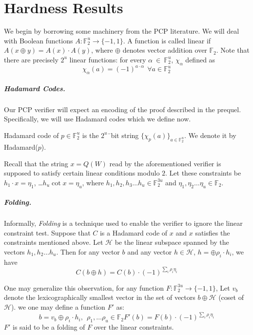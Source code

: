 \chapter{Hardness Results}\label{section:hardness}

We begin by borrowing some machinery from the PCP literature. 
We will deal with Boolean functions $A:\mathbb{F}^u_2 \rightarrow
\{-1, 1\}$.  A function is called linear if $A(x \oplus y) = A(x)
\cdot A(y)$, where $\oplus$ denotes vector addition over
$\mathbb{F}_2$. Note that there are precisely $2^u$ linear functions:
for every $\alpha\ \in \ \mathbb{F}^u_2$, $\chi_\alpha$
defined as
\[
\chi_\alpha(a) = (-1)^{a \cdot \alpha} ~~\forall a \in \mathbb{F}^u_2
\]


\paragraph{Hadamard Codes.} Our PCP verifier will
expect an encoding of the proof described in the prequel.
Specifically, we will use Hadamard codes which we define now.


\begin{definition}
Hadamard code of $p \in \mathbb{F}^{u}_2$ is the $2^u$¯bit string 
$\{\chi_p(a)\}_{a \in \mathbb{F}^u_2}$. We denote it by Hadamard($p$).
\end{definition}

Recall that the string $x = Q(W)$ read by the aforementioned verifier
is supposed to satisfy certain linear conditions modulo $2$. Let these
constraints be $h_1 \cdot x = \eta_1$, \ldots $h_u \cot x = \eta_u$,
where $h_1, h_2, h_3 \ldots h_u \in \mathbb{F}^{3u}_2$ and $\eta_1,
\eta_2 \ldots \eta_u \in \mathbb{F}_2$.

\paragraph{Folding.}Informally, {\em Folding} is a technique used to enable the verifier to 
ignore the linear constraint test. Suppose that $C$ is a Hadamard code
of $x$ and $x$ satisfies the constraints mentioned above.  Let
${\mathcal H}$ be the linear subspace spanned by the vectors $h_1, h_2
\ldots h_u$.  Then for any vector $b$ and any vector $h \in {\mathcal
  H}$, $h = \oplus \rho_i \cdot h_i$, we have
\[
      C(b \oplus h) = C(b)\cdot(-1)^{\sum_i \rho_i \eta_i}
\]

One may generalize this observation, for any function $F:
\mathbb{F}^{3u}_2 \rightarrow \{-1, 1\}$, Let $v_b$ denote the
lexicographically smallest vector in the set of vectors $b \oplus
{\mathcal H}$ (coset of ${\mathcal H}$).  we one may define a function
$F'$ as:
\[
b = v_b \oplus \rho_i\cdot h_i, ~~ \rho_1,\ldots \rho_u \in \mathbb{F}_2
F'(b) = F(b) \cdot (-1)^{\sum_i \rho_i \eta_i}
\]
$F'$ is said to be a folding of $F$ over the linear constraints.

